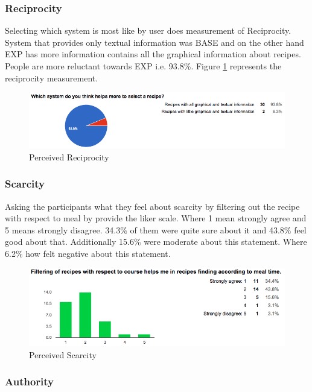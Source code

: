 \subsubsection{Reciprocity}

Selecting which system is most like by user does measurement of Reciprocity. System that provides only textual information was BASE and on the other hand EXP has more information contains all the graphical information about recipes. People are more reluctant towards EXP i.e. 93.8\%. Figure \ref{fig:ch5_stat_reciprocity} represents the reciprocity measurement.

\begin{figure}[h]
	\centering
	\includegraphics[width=1\linewidth]{figures/ch5_stat_reciprocity}
	\caption{Perceived Reciprocity}
	\label{fig:ch5_stat_reciprocity}
\end{figure}

\newpage
\subsubsection{Scarcity}

Asking the participants what they feel about scarcity by filtering out the recipe with respect to meal by provide the liker scale. Where 1 mean strongly agree and 5 means strongly disagree.  34.3\% of them were quite sure about it and 43.8\% feel good about that. Additionally 15.6\% were moderate about this statement. Where 6.2\% how felt negative about this statement. 
\begin{figure}[h]
	\centering
	\includegraphics[width=1\linewidth]{figures/ch5_stat_scarcity.png}
	\caption{Perceived Scarcity}
	\label{fig:ch5_stat_scarcity}
\end{figure}

\subsubsection{Authority}

